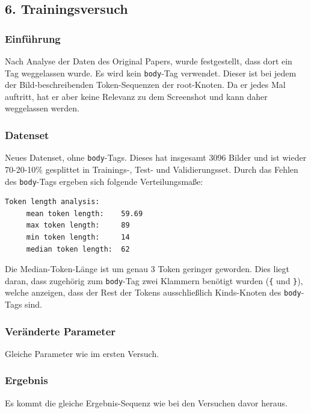 \documentclass[pdftex,a4paper,halfparskip, article]{scrartcl}
\begin{document}
\subsection{6. Trainingsversuch}

\subsubsection*{Einführung}

Nach Analyse der Daten des Original Papers, wurde festgestellt, dass dort ein Tag weggelassen wurde. Es wird kein \texttt{body}-Tag verwendet. Dieser ist bei jedem der Bild-beschreibenden Token-Sequenzen der root-Knoten. Da er jedes Mal auftritt, hat er aber keine Relevanz zu dem Screenshot und kann daher weggelassen werden.



\subsubsection*{Datenset}

Neues Datenset, ohne \texttt{body}-Tags. Dieses hat insgesamt 3096 Bilder und ist wieder 70-20-10\% gesplittet in Trainings-, Test- und Validierungsset. Durch das Fehlen des \texttt{body}-Tags ergeben sich folgende Verteilungsmaße:
\begin{verbatim}
Token length analysis:
     mean token length:    59.69
     max token length:     89
     min token length:     14
     median token length:  62
\end{verbatim}

Die Median-Token-Länge ist um genau 3 Token geringer geworden. Dies liegt daran, dass zugehörig zum \texttt{body}-Tag zwei Klammern benötigt wurden (\texttt{\{} und \texttt{\}}), welche anzeigen, dass der Rest der Tokens ausschließlich Kinds-Knoten des \texttt{body}-Tags sind.

\subsubsection*{Veränderte Parameter}

Gleiche Parameter wie im ersten Versuch.

\subsubsection*{Ergebnis}

Es kommt die gleiche Ergebnis-Sequenz wie bei den Versuchen davor heraus.
\end{document}
